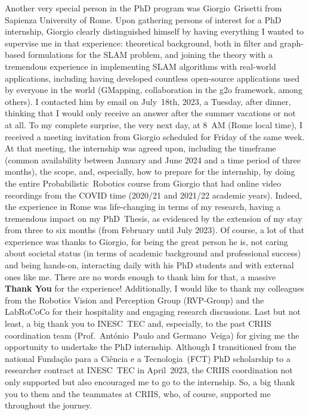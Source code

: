 Another very special person in the PhD program was Giorgio~Grisetti from
Sapienza University of Rome. Upon gathering persons of interest for a PhD
internship, Giorgio clearly distinguished himself by having everything I wanted
to supervise me in that experience: theoretical background, both in filter and
graph-based formulations for the SLAM problem, and joining the theory with a
tremendous experience in implementing SLAM algorithms with real-world
applications, including having developed countless open-source applications used
by everyone in the world (GMapping, collaboration in the g2o framework, among
others). I contacted him by email on July~18th, 2023, a Tuesday, after dinner,
thinking that I would only receive an answer after the summer vacations or not
at all. To my complete surprise, the very next day, at 8~AM (Rome local time),
I received a meeting invitation from Giorgio scheduled for Friday of the same
week. At that meeting, the internship was agreed upon, including the timeframe
(common availability between January and June 2024 and a time period of three
months), the scope, and, especially, how to prepare for the internship, by doing
the entire Probabilistic~Robotics course from Giorgio that had online video
recordings from the COVID time (2020/21 and 2021/22 academic years).
Indeed, the experience in Rome was life-changing in terms of my research,
having a tremendous impact on my PhD~Thesis, as evidenced by the extension of my
stay from three to six months (from February until July 2023). Of course, a
lot of that experience was thanks to Giorgio, for being the great person he is,
not caring about societal status (in terms of academic background and
professional success) and being hands-on, interacting daily with his PhD
students and with external ones like me. There are no words enough to thank him
for that, a massive \textbf{Thank You} for the experience!
Additionally, I would like to thank my colleagues from the
Robotics Vision and Perception Group (RVP-Group) and the LabRoCoCo for their
hospitality and engaging research discussions. Last but not least, a big thank
you to INESC~TEC and, especially, to the past CRIIS coordination team
(Prof.~António~Paulo and Germano~Veiga) for giving me the opportunity to
undertake the PhD internship. Although I transitioned from the national
Fundação para a Ciência e a Tecnologia~(FCT) PhD scholarship to a researcher
contract at INESC~TEC in April~2023, the CRIIS coordination not only supported
but also encouraged me to go to the internship. So, a big thank you to them and
the teammates at CRIIS, who, of course, supported me throughout the journey.

